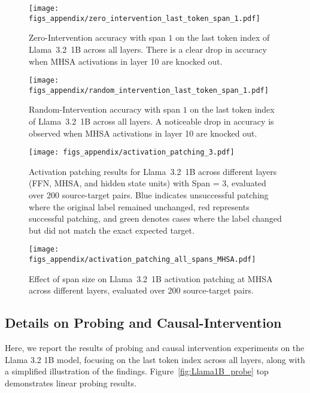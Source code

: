 \begin{figure}[bht]
    \centering
    \texttt{[image: figs\_appendix/zero\_intervention\_last\_token\_span\_1.pdf]}
  \caption{Zero-Intervention accuracy with span $1$ on the last token index of Llama~3.2~1B across all layers. There is a clear drop in accuracy when MHSA activations in layer 10 are knocked out.}
  \label{fig:Llama1B_zero}
\end{figure} 

\begin{figure}[bht]
    \centering
    \texttt{[image: figs\_appendix/random\_intervention\_last\_token\_span\_1.pdf]}
  \caption{Random-Intervention accuracy with span $1$ on the last token index of Llama~3.2~1B across all layers. A noticeable drop in accuracy is observed when MHSA activations in layer 10 are knocked out.}
  \label{fig:Llama1B_random}
\end{figure} 


\begin{figure*}[t!]
    \centering
    \texttt{[image: figs\_appendix/activation\_patching\_3.pdf]}
    \caption{Activation patching results for Llama~3.2~1B across different layers (FFN, MHSA, and hidden state units) with Span = 3, evaluated over 200 source-target pairs. Blue indicates unsuccessful patching where the original label remained unchanged, red represents successful patching, and green denotes cases where the label changed but did not match the exact expected target.} 
    \label{fig:Llama1B_patching}
\end{figure*}

\begin{figure*}[t!]
    \centering
    \texttt{[image: figs\_appendix/activation\_patching\_all\_spans\_MHSA.pdf]}
    \caption{Effect of span size on Llama~3.2~1B activation patching at MHSA across different layers, evaluated over 200 source-target pairs.} 
    \label{fig:Llama1B_span_size}
\end{figure*}

\subsection{Details on Probing and Causal-Intervention} \label{app:detailed_figures}
Here, we report the results of probing and causal intervention experiments on the Llama 3.2 1B model, focusing on the last token index across all layers, along with a simplified illustration of the findings. Figure~\ref{fig:Llama1B_probe} top demonstrates linear probing results.

